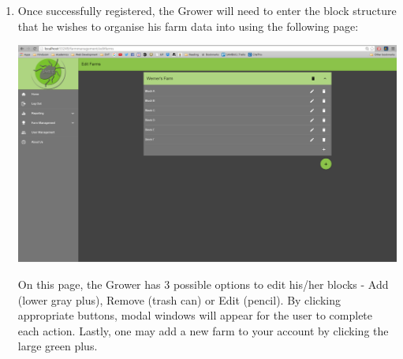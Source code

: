 \documentclass[11pt,a4paper,titlepage]{article}
\begin{document}
\begin{enumerate}
\begin{enumerate}
\begin{center}
			\end{center}
		\end{enumerate}
\item Once successfully registered, the Grower will need to enter the block structure that he wishes to organise his farm data into using the following page: 
	\begin{center}
		\includegraphics[width=\linewidth]{manageblocks.png}
	\end{center}
	On this page, the Grower has 3 possible options to edit his/her blocks - Add (lower gray plus), Remove (trash can) or Edit (pencil). By clicking appropriate buttons, modal windows will appear for the user to complete each action. Lastly, one may add a new farm to your account by clicking the large green plus.
	

\end{enumerate}
\end{document}
